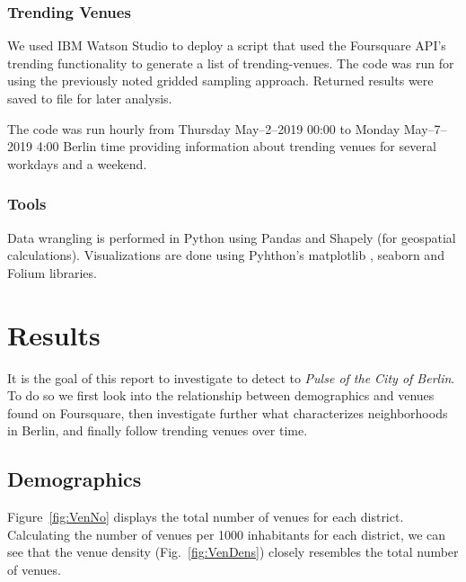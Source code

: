 \documentclass[letter]{scrartcl}
\begin{document}
\subsubsection{Trending Venues}

We used IBM Watson Studio to deploy a script that used the Foursquare API's trending functionality to generate a list of trending-venues. The code was run for using the previously noted gridded sampling approach. Returned results were saved to file for later analysis.

The code was run hourly  from Thursday May--2--2019 00:00  to Monday May--7--2019 4:00 Berlin time providing information about trending venues for several workdays and a weekend. 

\subsubsection{Tools}
Data wrangling is performed in Python using Pandas \cite{pd} and Shapely \cite{shapely} (for geospatial calculations).
Visualizations are done using Pyhthon's matplotlib \cite{matplotlib}, seaborn \cite{sns} and Folium \cite{Folium} libraries. 
 
\section{Results}

It is the goal of this report to investigate to detect to \emph{Pulse of the City of Berlin}. To do so we first look into the relationship between demographics and venues found on Foursquare, then investigate further what characterizes neighborhoods in Berlin, and finally follow trending venues over time.

\subsection{Demographics}
Figure~\ref{fig:VenNo} displays the total number of venues for each district. 
Calculating the number of venues per 1000 inhabitants for each district, we can see that the venue density  (Fig.~\ref{fig:VenDens}) closely resembles the total number of venues.  
\end{document}
